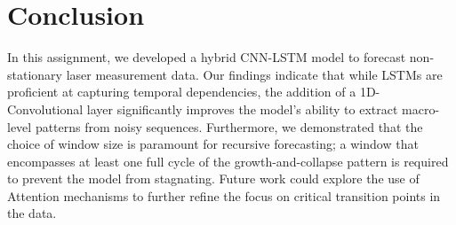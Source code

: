 \documentclass[conference]{IEEEtran}
\begin{document}
\section{Conclusion}
In this assignment, we developed a hybrid CNN-LSTM model to forecast non-stationary laser measurement data. Our findings indicate that while LSTMs are proficient at capturing temporal dependencies, the addition of a 1D-Convolutional layer significantly improves the model's ability to extract macro-level patterns from noisy sequences. Furthermore, we demonstrated that the choice of window size is paramount for recursive forecasting; a window that encompasses at least one full cycle of the growth-and-collapse pattern is required to prevent the model from stagnating. Future work could explore the use of Attention mechanisms to further refine the focus on critical transition points in the data.

\nocite{*}


\end{document}

